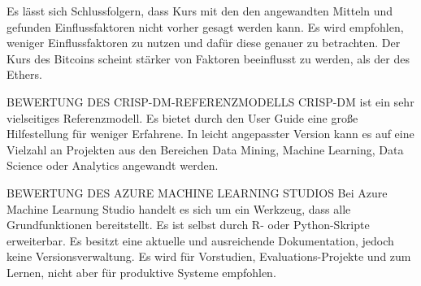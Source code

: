 Es lässt sich Schlussfolgern, dass Kurs mit den den angewandten Mitteln und gefunden Einflussfaktoren nicht vorher gesagt werden kann. Es wird empfohlen, weniger Einflussfaktoren zu nutzen und dafür diese genauer zu betrachten. Der Kurs des Bitcoins scheint stärker von Faktoren beeinflusst zu werden, als der des Ethers.

{\normalsize BEWERTUNG DES CRISP-DM-REFERENZMODELLS} \newline
CRISP-DM ist ein sehr vielseitiges Referenzmodell. Es bietet durch den User Guide eine große Hilfestellung für weniger Erfahrene. In leicht angepasster Version kann es auf eine Vielzahl an Projekten aus den Bereichen Data Mining, Machine Learning, Data Science oder Analytics angewandt werden.

{\normalsize BEWERTUNG DES AZURE MACHINE LEARNING STUDIOS} \newline
Bei Azure Machine Learnung Studio handelt es sich um ein Werkzeug, dass alle Grundfunktionen bereitstellt. Es ist selbst durch R- oder Python-Skripte erweiterbar. Es besitzt eine aktuelle und ausreichende Dokumentation, jedoch keine Versionsverwaltung. Es wird für Vorstudien, Evaluations-Projekte und zum Lernen, nicht aber für produktive Systeme empfohlen.
